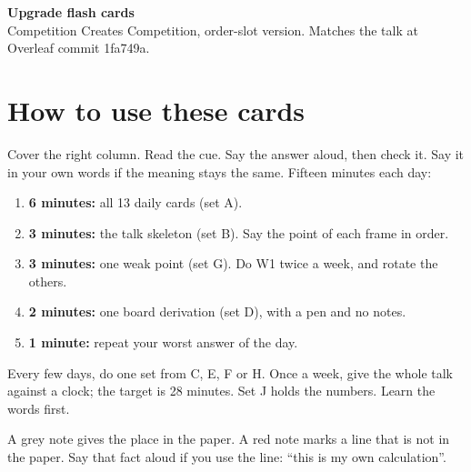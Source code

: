\documentclass[10.5pt]{article}
\begin{document}
{\sffamily\LARGE\bfseries\color{ox} Upgrade flash cards}\\
{\color{gr} Competition Creates Competition, order-slot version. Matches the talk at Overleaf commit 1fa749a.}

\section*{How to use these cards}
Cover the right column. Read the cue. Say the answer aloud, then check it. Say it in your own words if the meaning stays the same. Fifteen minutes each day:
\begin{enumerate}[nosep,leftmargin=1.5em]
\item \textbf{6 minutes:} all 13 daily cards (set A).
\item \textbf{3 minutes:} the talk skeleton (set B). Say the point of each frame in order.
\item \textbf{3 minutes:} one weak point (set G). Do W1 twice a week, and rotate the others.
\item \textbf{2 minutes:} one board derivation (set D), with a pen and no notes.
\item \textbf{1 minute:} repeat your worst answer of the day.
\end{enumerate}
Every few days, do one set from C, E, F or H. Once a week, give the whole talk against a clock; the target is 28 minutes. Set J holds the numbers. Learn the words first.

A grey note gives the place in the paper. A red note marks a line that is not in the paper. Say that fact aloud if you use the line: ``this is my own calculation''.
\end{document}
